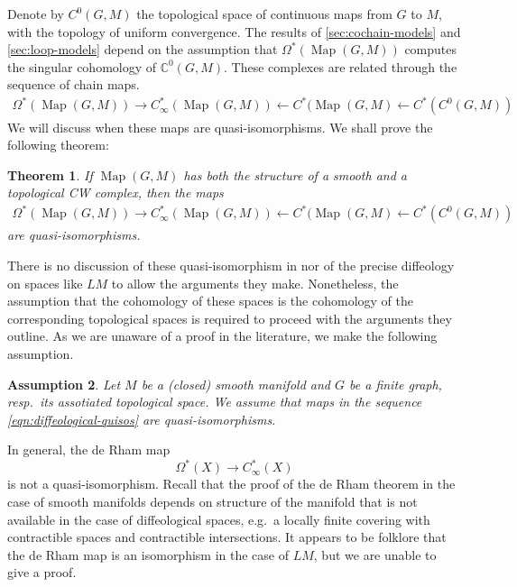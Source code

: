 \documentclass{scrartcl}
\theoremstyle{plain}
\newtheorem{theorem}{Theorem}[section]
\newtheorem{assumption}[theorem]{Assumption}
\theoremstyle{definition}
\newcommand{\C}{\mathbb C}
\newcommand{\from}{\leftarrow}
\DeclareMathOperator{\Map}{Map}
\DeclareMathOperator{\cConf}{\overline{Conf}}
\begin{document}
Denote by $C^0(G, M)$ the topological space of continuous maps from $G$ to $M$, with the topology of uniform convergence. The results of \cref{sec:cochain-models} and \cref{sec:loop-models} depend on the assumption that $\Omega^*(\Map(G, M))$ computes the singular cohomology of $\C^0(G, M)$. These complexes are related through the sequence of chain maps. 
\begin{align}
    \Omega^*(\Map(G, M)) \to C_\infty^*(\Map(G, M)) \from C^*(\Map(G, M)\from C^*(C^0(G, M)) \label{eqn:diffeological-quisos}
\end{align}
We will discuss when these maps are quasi-isomorphisms. We shall prove the following theorem: 
\begin{theorem}
    If $\Map(G, M)$ has both the structure of a smooth and a topological CW complex, then the maps \begin{align*}
        \Omega^*(\Map(G, M)) \to C_\infty^*(\Map(G, M)) \from C^*(\Map(G, M)\from C^*(C^0(G, M))
    \end{align*}
    are quasi-isomorphisms.
\end{theorem}
There is no discussion of these quasi-isomorphism in \cite{naef2019string} nor of the precise diffeology on spaces like $LM$ to allow the arguments they make. Nonetheless, the assumption that the cohomology of these spaces is the cohomology of the corresponding topological spaces is required to proceed with the arguments they outline. As we are unaware of a proof in the literature, we make the following assumption.  

\begin{assumption}\label{assumption}
    Let $M$ be a (closed) smooth manifold and $G$ be a finite graph, resp.\ its assotiated topological space. We assume that maps in the sequence \ref{eqn:diffeological-quisos} are quasi-isomorphisms. %
\end{assumption}

In general, the de Rham map $$\Omega^*(X) \to C_\infty^*(X)$$ is not a quasi-isomorphism. Recall that the proof of the de Rham theorem in the case of smooth manifolds depends on structure of the manifold that is not available in the case of diffeological spaces, e.g.\ a locally finite covering with contractible spaces and contractible intersections. It appears to be folklore that the de Rham map is an isomorphism in the case of $LM$, but we are unable to give a proof. 
\end{document}
